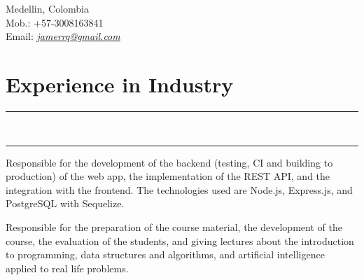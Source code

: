 \documentclass[]{rahulworld-resume}
\begin{document}
\hfill
\begin{minipage}[t]{0.66\textwidth}
    \hspace*{0pt}\hfill    \\
    \hspace*{0pt}\hfill    \\
    \hspace*{0pt}\hfill Medellin, Colombia\\
    \hspace*{0pt}\hfill Mob.: +57-3008163841 \\
    \hspace*{0pt}\hfill Email:
    \textit{\href{mailto:janerrq@gmail.com}{jamerrq@gmail.com}}
    \section{Experience in Industry}
    \noindent\rule{12.5cm}{0.4pt} \\
    \noindent\rule{12.5cm}{0.4pt}

    \noindent
    \hspace{5em}%
    \begin{minipage}{0.85\textwidth\vspace{2pt}} Responsible for the development of
        the backend (testing, CI and building to production) of the web app, the implementation of the REST API, and the
        integration with the frontend. The technologies used are Node.js, Express.js,
        and PostgreSQL with Sequelize.
    \end{minipage}

    \noindent
    \hspace{5em}%
    \begin{minipage}{0.85\textwidth\vspace{2pt}} Responsible for the preparation of
        the course material, the development of the course, the evaluation of the
        students, and giving lectures about the introduction to programming, data
        structures and algorithms, and artificial intelligence applied to real life
        problems.


\end{minipage}
\end{minipage}
\end{document}

